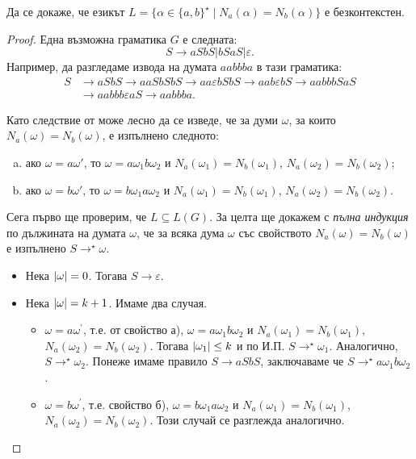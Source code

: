 \begin{problem}
  Да се докаже, че езикът $L = \{\alpha \in \{a,b\}^\star\mid N_a(\alpha) = N_b(\alpha)\}$ 
  е безконтекстен.
\end{problem}
\begin{proof}
  Една възможна граматика $G$ е следната: 
  \[S \rightarrow aSbS\vert bSaS \vert\varepsilon.\]
  Например, да разгледаме извода на думата $aabbba$ в тази граматика:
  \begin{align*}
    S & \to aSbS \to aaSbSbS \to aa\varepsilon bSbS \to aab\varepsilon bS \to aabbbSaS\\
    & \to aabbb\varepsilon a S \to aabbba.
  \end{align*}
  
  Като следствие от  може лесно да се изведе, че за думи $\omega$, за които $N_a(\omega) = N_b(\omega)$,
  е изпълнено следното:
  \begin{enumerate}[a)]
  \item 
    ако $\omega = a\omega'$, то
    $\omega = a\omega_1b\omega_2$ и $N_a(\omega_1) = N_b(\omega_1)$, $N_a(\omega_2) = N_b(\omega_2)$;
  \item
    ако $\omega = b\omega'$, то
    $\omega = b\omega_1a\omega_2$ и $N_a(\omega_1) = N_b(\omega_1)$, $N_a(\omega_2) = N_b(\omega_2)$.
  \end{enumerate}

  Сега първо ще проверим, че $L \subseteq L(G)$.
  За целта ще докажем с {\em пълна индукция} по дължината на думата $\omega$, че за всяка дума $\omega$ със свойството $N_a(\omega) = N_b(\omega)$ е изпълнено
  $S \rightarrow^\star \omega$.
  \begin{itemize}
  \item 
    Нека $\lvert{\omega}\rvert = 0$. Тогава $S \rightarrow \varepsilon$.
  \item
    Нека $\lvert{\omega}\rvert = k+1$. Имаме два случая.
    \begin{itemize}
    \item 
      $\omega = a\omega^\prime$, т.е. от свойство а), $\omega = a\omega_1b\omega_2$ и $N_a(\omega_1) = N_b(\omega_1)$, $N_a(\omega_2) = N_b(\omega_2)$.
      Тогава $\lvert{\omega_1}\rvert \leq k$ и по И.П. $S \rightarrow^\star \omega_1$.
      Аналогично, $S \rightarrow^\star \omega_2$.
      Понеже имаме правило $S \rightarrow aSbS$, заключаваме че $S \rightarrow^\star a\omega_1b\omega_2$.
    \item
      $\omega = b\omega^\prime$, т.е. свойство б), $\omega = b\omega_1a\omega_2$ и $N_a(\omega_1) = N_b(\omega_1)$, $N_a(\omega_2) = N_b(\omega_2)$.
      Този случай се разглежда аналогично.
    \end{itemize}
  \end{itemize}
  

\end{proof}
